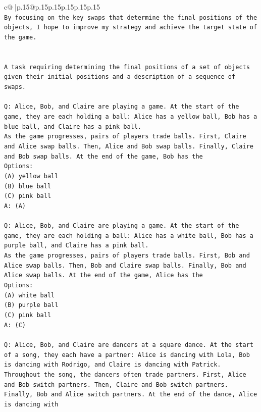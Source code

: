 \documentclass{article}
\begin{document}
{\begin{supertabular}{c@{$\;$}|p{.15\linewidth}@{}p{.15\linewidth}p{.15\linewidth}p{.15\linewidth}p{.15\linewidth}p{.15\linewidth}}
{{{\\ 
\texttt{By focusing on the key swaps that determine the final positions of the objects, I hope to improve my strategy and achieve the target state of the game.} \\
\\ 
\\ 
\texttt{A task requiring determining the final positions of a set of objects given their initial positions and a description of a sequence of swaps.} \\
\\ 
\texttt{Q: Alice, Bob, and Claire are playing a game. At the start of the game, they are each holding a ball: Alice has a yellow ball, Bob has a blue ball, and Claire has a pink ball.} \\
\texttt{As the game progresses, pairs of players trade balls. First, Claire and Alice swap balls. Then, Alice and Bob swap balls. Finally, Claire and Bob swap balls. At the end of the game, Bob has the} \\
\texttt{Options:} \\
\texttt{(A) yellow ball} \\
\texttt{(B) blue ball} \\
\texttt{(C) pink ball} \\
\texttt{A: (A)} \\
\\ 
\texttt{Q: Alice, Bob, and Claire are playing a game. At the start of the game, they are each holding a ball: Alice has a white ball, Bob has a purple ball, and Claire has a pink ball.} \\
\texttt{As the game progresses, pairs of players trade balls. First, Bob and Alice swap balls. Then, Bob and Claire swap balls. Finally, Bob and Alice swap balls. At the end of the game, Alice has the} \\
\texttt{Options:} \\
\texttt{(A) white ball} \\
\texttt{(B) purple ball} \\
\texttt{(C) pink ball} \\
\texttt{A: (C)} \\
\\ 
\texttt{Q: Alice, Bob, and Claire are dancers at a square dance. At the start of a song, they each have a partner: Alice is dancing with Lola, Bob is dancing with Rodrigo, and Claire is dancing with Patrick.} \\
\texttt{Throughout the song, the dancers often trade partners. First, Alice and Bob switch partners. Then, Claire and Bob switch partners. Finally, Bob and Alice switch partners. At the end of the dance, Alice is dancing with} \\
}}}
\end{supertabular}}
\end{document}
